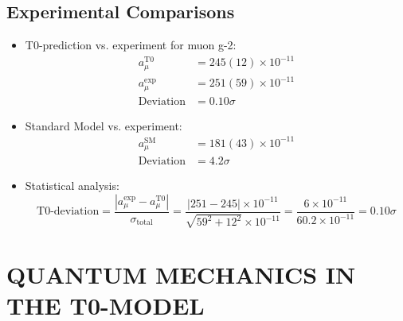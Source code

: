 \documentclass[12pt,a4paper]{article}
\begin{document}
	\subsection{Experimental Comparisons}
	\begin{itemize}
		\item T0-prediction vs. experiment for muon g-2:
		\begin{align}
			a_\mu^{\text{T0}} &= 245(12) \times 10^{-11} \\
			a_\mu^{\text{exp}} &= 251(59) \times 10^{-11} \\
			\text{Deviation} &= 0.10\sigma
		\end{align}
		
		\item Standard Model vs. experiment:
		\begin{align}
			a_\mu^{\text{SM}} &= 181(43) \times 10^{-11} \\
			\text{Deviation} &= 4.2\sigma
		\end{align}
		
		\item Statistical analysis:
		\begin{equation}
			\text{T0-deviation} = \frac{|a_\mu^{\text{exp}} - a_\mu^{\text{T0}}|}{\sigma_{\text{total}}} = \frac{|251 - 245| \times 10^{-11}}{\sqrt{59^2 + 12^2} \times 10^{-11}} = \frac{6 \times 10^{-11}}{60.2 \times 10^{-11}} = 0.10\sigma
		\end{equation}
	\end{itemize}
	
	\section{QUANTUM MECHANICS IN THE T0-MODEL}
	
\end{document}
